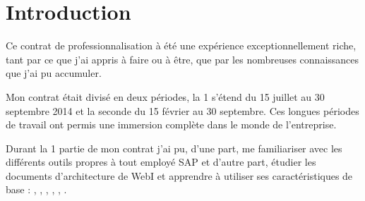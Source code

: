 \chapter*{Introduction}




Ce contrat de professionnalisation à été une expérience exceptionnellement riche, tant par ce que j'ai appris à faire ou à être, que par les nombreuses connaissances que j'ai pu accumuler. 

Mon contrat était divisé en deux périodes, la 1 s'étend du 15 juillet au 30 septembre 2014 et la seconde du 15 février au 30 septembre. Ces longues périodes de travail ont permis une immersion complète dans le monde de l'entreprise.

Durant la 1 partie de mon contrat j'ai pu, d'une part, me familiariser avec les diff\'{e}rents outils propres à tout employ\'{e} SAP et d'autre part, \'{e}tudier les documents d'architecture de WebI et apprendre \`{a} utiliser ses caract\'{e}ristiques de base : , , , , , .\\